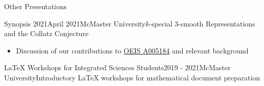 \begin{rSection}{Other Presentations}

\begin{rSubsection}{Synopsis 2021}{April 2021}{McMaster University}{$k$-special $3$-smooth Representations and the Collatz Conjecture}
    \begin{itemize}
      \addtolength\itemsep{-0.5em}
      \item Discussion of our contributions to \href{https://oeis.org/A005184}{OEIS A005184} and relevant background
    \end{itemize}
\end{rSubsection}
\smallskip

\begin{rSubsection}{LaTeX Workshops for Integrated Sciences Students}{2019 - 2021}{McMaster University}{Introductory LaTeX workshops for mathematical document preparation}
\end{rSubsection}
\smallskip







\end{rSection}
